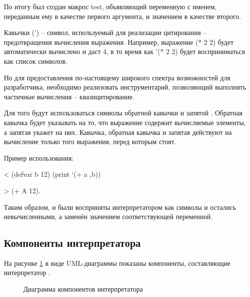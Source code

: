 По итогу был создан макрос test, объявляющий переменную с именем, переданным ему в качестве первого аргумента, и значением в качестве второго.

Кавычки (') -- символ, используемый для реализации цитирования -- предотвращения вычисления выражения. Например, выражение (* 2 2) будет автоматически вычислено и даст 4, в то время как '(* 2 2) будет восприниматься как список символов.

Но для предоставления по-настоящему широкого спектра возможностей для разработчика, необходимо реализовать инструментарий, позволяющий выполнять частичные вычисления -- квазицитирование.

Для того будут использоваться символы обратной кавычки  и запятой \quotes{,}. Обратная кавычка будет указывать на то, что выражение содержит вычисляемые элементы, а запятая укажет на них. Кавычка, обратная кавычка и запятая действуют на вычисление только того выражения, перед которым стоят.

Пример использования:

< (defvar b 12) (print `(+ a ,b))

> (+ A 12).

Таким образом, \quotes{+} и  были восприняты интерпретатором как символы и остались невычисленными, а  заменён значением соответствующей переменной.

\subsection{Компоненты интерпретатора}

На рисунке \ref{kompdiagram:image} в виде UML-диаграммы показаны компоненты, составляющие интерпретатор \cite{e26}.

\begin{figure}[ht]
	\caption{Диаграмма компонентов интерпретатора}
	\label{kompdiagram:image}
\end{figure}

